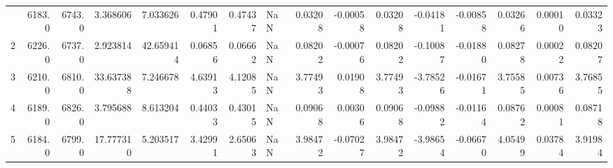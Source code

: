\begin{longtable}{rrrrrrrlrrrrrrrr}
\bottomrule
\endlastfoot
           1 &          6183.0 &          6743.0 &            3.368606 &              7.033626 &                    0.47901 &                           0.47437 &                                        NaN &                                            0.03208 &                                       -0.00058 &                                            0.03208 &                                          -0.04181 &                                           -0.00858 &                 0.03266 &                0.00010 &                   0.03323 \\
           2 &          6226.0 &          6737.0 &            2.923814 &             42.659414 &                    0.06856 &                           0.06662 &                                        NaN &                                            0.08202 &                                       -0.00076 &                                            0.08202 &                                          -0.10087 &                                           -0.01880 &                 0.08278 &                0.00022 &                   0.08207 \\
           3 &          6210.0 &          6810.0 &           33.637388 &              7.246678 &                    4.63913 &                           4.12085 &                                        NaN &                                            3.77493 &                                        0.01908 &                                            3.77493 &                                          -3.78526 &                                           -0.01671 &                 3.75585 &                0.00736 &                   3.76855 \\
           4 &          6189.0 &          6826.0 &            3.795688 &              8.613204 &                    0.44033 &                           0.43015 &                                        NaN &                                            0.09068 &                                        0.00306 &                                            0.09068 &                                          -0.09882 &                                           -0.01164 &                 0.08762 &                0.00081 &                   0.08718 \\
           5 &          6184.0 &          6799.0 &           17.777310 &              5.203517 &                    3.42991 &                           2.65063 &                                        NaN &                                            3.98472 &                                       -0.07027 &                                            3.98472 &                                          -3.98654 &                                           -0.06670 &                 4.05499 &                0.03784 &                   3.91984 \\

\end{longtable}
